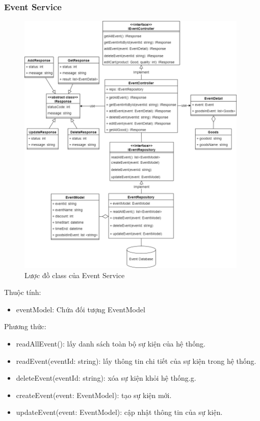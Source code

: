\subsubsection{Event Service}
\begin{figure}[!htp]
	\centering
	\includegraphics[width=11cm]{img/Architecture/service/EventService.png}
	\newline
	\caption{Lược đồ class của Event Service}
\end{figure}

Thuộc tính:
\begin{itemize}
	\item eventModel: Chứa đối tượng EventModel
\end{itemize}
Phương thức:
\begin{itemize}
	\item readAllEvent(): lấy danh sách toàn bộ sự kiện của hệ thống.
	\item readEvent(eventId: string): lấy thông tin chi tiết của sự kiện trong hệ thống.
	\item deleteEvent(eventId: string): xóa sự kiện khỏi hệ thống.g.
	\item createEvent(event: EventModel): tạo sự kiện mới.
	\item updateEvent(event: EventModel): cập nhật thông tin của sự kiện.
\end{itemize}

